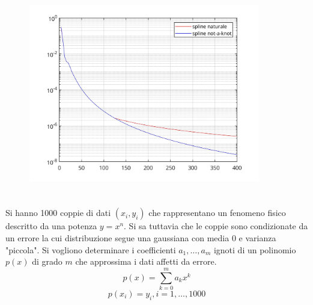 \documentclass[10pt,a4paper]{article}
\begin{document}
\section{}
\begin{figure}[h!]
  \centering
  \includegraphics[width=0.9\textwidth]{../figure/esercizio_23}  
\end{figure}
\section{}
Si hanno 1000 coppie di dati $(x_i,y_i)$ che rappresentano un fenomeno fisico descritto da una potenza $y=x^n$. Si sa tuttavia che le coppie sono condizionate da un errore la cui distribuzione segue una gaussiana con media 0 e varianza "piccola". Si vogliono determinare i coefficienti $a_1,\dots,a_m$ ignoti di un polinomio $p(x)$ di grado $m$ che approssima i dati affetti da errore.
$$p(x)=\sum_{k=0}^ma_kx^k$$$$p(x_i)=y_i, i = 1,\dots,1000$$
\end{document}

